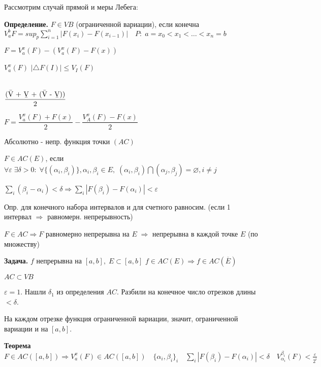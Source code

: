 Рассмотрим случай прямой и меры Лебега:

 \textbf{Определение.} \quad $F \in VB$ (ограниченной вариации), если конечна $V_a^b F = sup_p \sum_{i=1}^n |F(x_i) - F(x_{i-1})|
\quad P: \; a = x_0 < x_1 < \ldots < x_n = b$

$F = V_a^x(F) - (V_a^x (F) - F(x))$

$V_a^x(F)$   $|\triangle F(I)| \leqslant V_I(F)$

$\phantom{a}$

$\dfrac{\text{(\={V} + \b{V} + (\={V} - \b{V}))} }{2}$

$F = \dfrac{V_a^x(F) + F(x)}{2} - \dfrac{V_A^x(F) - F(x)}{2}$

Абсолютно - непр. функция точки $(AC)$

$F \in AC(E)$, если $\forall \varepsilon \; \exists \delta > 0: \;
\forall \{(\alpha_i, \beta_i)\}, \alpha_i, \beta_i \in E,\;
(\alpha_i, \beta_i)\bigcap(\alpha_j, \beta_j) = \varnothing, i
\neq j $

$\sum_i (\beta_i - \alpha_i) < \delta \Rightarrow \sum_i
|F(\beta_i) - F(\alpha_i)| < \varepsilon$

Опр. для конечного набора интервалов и для счетного равносим.
(если 1 интервал $\Rightarrow$ равномерн. непрерывность)

$F \in AC \Rightarrow F$ равномерно непрерывна на $E \;
\Rightarrow$ непрерывна в каждой точке $E$ (по множеству)

\textbf{Задача.} \quad  $f$ непрерывна на  $[a,b], \; E \subset
[a,b]$ $f \in AC(E) \Rightarrow f \in AC(\overline{E})$


%
%
%
%
%
%
%
%
%
%
%
%
$AC \subset VB$

$\varepsilon = 1$. Нашли $\delta_1$ из определения $AC$. Разбили
на конечное число отрезков длины  $< \delta$.

На каждом отрезке функция ограниченной вариации, значит,
ограниченной вариации и на $[a,b]$.

\textbf{Теорема} \quad $F \in AC([a,b]) \Rightarrow V_a^x(F) \in
AC([a,b]) \quad \{\alpha_i, \beta_i\}_i \quad \sum_i |F(\beta_i) -
F(\alpha_i)| < \delta \quad V_{\alpha_i}^{\beta_i}(F) <
\frac{\varepsilon}{2^i}$


